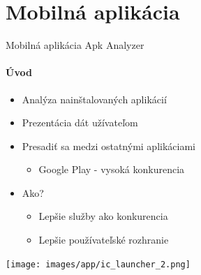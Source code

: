 \documentclass{beamer}
\begin{document}
  \section{Mobilná aplikácia}    
  \begin{frame}[label=lists]{Mobilná aplikácia Apk Analyzer}
 	 \framesubtitle{Úvod}
	\begin{minipage}[htb]{\textwidth}
		\begin{minipage}[t]{0.5\textwidth}
			\begin{itemize}
				\item Analýza nainštalovaných aplikácií
				\item Prezentácia dát užívateľom
				\item Presadiť sa medzi ostatnými aplikáciami
				\begin{itemize}
					\item Google Play - vysoká konkurencia
				\end{itemize}
				\item Ako?
				\begin{itemize}
					\item Lepšie služby ako konkurencia
					\item Lepšie používateľské rozhranie
				\end{itemize}
			\end{itemize}
     		\vfill
		\end{minipage}%
	\hfill
	\centering
		\begin{minipage}[t][][b]{0.4\textwidth}
		\centering
		\texttt{[image: images/app/ic\_launcher\_2.png]}
		\label{fig:app-list}
		\end{minipage}%
	\end{minipage}
  \end{frame}   
     
\end{document}
